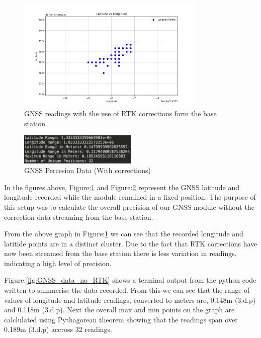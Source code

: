 \documentclass{report}
\begin{document}
\begin{figure}[H]
  \centering
  \includegraphics[width=0.8\textwidth]{Pictures/GNSS_RTK.png}
  \caption{GNSS readings with the use of RTK corrections form the base station}
  \label{fig:GNSS_RTK}
\end{figure}

\begin{figure}[H]
  \centering
  \includegraphics[width=0.5\textwidth]{Pictures/GNSS_data_correction.png}
  \caption{GNSS Percesion Data (With corrections)}
  \label{fig:GNSS_data_RTK}
\end{figure}

In the figures above, Figure:\ref{fig:GNSS_RTK} and
Figure:\ref{fig:GNSS_data_RTK} represent the GNSS latitude and longitude
recorded while the module remained in a fixed position. The purpose of this
setup was to calculate the overall precision of our GNSS module without the
correction data streaming from the base station.

From the above graph in Figure:\ref{fig:GNSS_RTK} we can see that the recorded
longitude and latitide points are in a distinct cluster. Due to the fact that
RTK corrections have now been streamed from the base station there is less
variation in readings, indicating a high level of precision.

Figure:\ref{fig:GNSS_data_no_RTK} shows a terminal output from the python code
written to summerise the data recorded. From this we can see that the range of
values of longitude and latitude readings, converted to meters are, 0.148m
(3.d.p) and  0.118m (3.d.p). Next the overall max and min points on the graph
are calclulated using Pythagorean theorem showing that the readings span over
0.189m (3.d.p) accross 32 readings.
\end{document}
